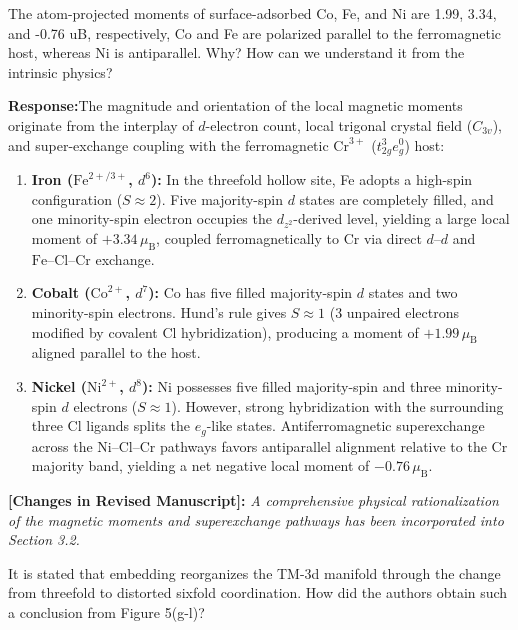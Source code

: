 \documentclass[11pt, sans, a4paper]{moderncv}
\newcommand{\response}{\vspace{0.4em}\noindent\textbf{\color{actionblue}Response:}\hspace{0.5em}}
\newcommand{\manuscriptchange}[1]{\vspace{0.3em}\noindent\textbf{\color{acsblue}[Changes in Revised Manuscript]:} \textit{#1}\vspace{0.4em}}
\begin{document}
\begin{reviewercomment}
The atom-projected moments of surface-adsorbed Co, Fe, and Ni are 1.99, 3.34, and -0.76 uB, respectively, Co and Fe are polarized parallel to the ferromagnetic host, whereas Ni is antiparallel. Why? How can we understand it from the intrinsic physics?
\end{reviewercomment}

\response The magnitude and orientation of the local magnetic moments originate from the interplay of $d$-electron count, local trigonal crystal field ($C_{3v}$), and super-exchange coupling with the ferromagnetic $\text{Cr}^{3+}$ ($t_{2g}^3 e_g^0$) host:
\begin{enumerate}[leftmargin=1.5em, itemsep=0.2em]
    \item \textbf{Iron ($\text{Fe}^{2+/3+}$, $d^6$):} In the threefold hollow site, Fe adopts a high-spin configuration ($S \approx 2$). Five majority-spin $d$ states are completely filled, and one minority-spin electron occupies the $d_{z^2}$-derived level, yielding a large local moment of $+3.34\,\mu_{\mathrm{B}}$, coupled ferromagnetically to Cr via direct $d\text{--}d$ and $\text{Fe--Cl--Cr}$ exchange.
    \item \textbf{Cobalt ($\text{Co}^{2+}$, $d^7$):} Co has five filled majority-spin $d$ states and two minority-spin electrons. Hund's rule gives $S \approx 1$ ($3$ unpaired electrons modified by covalent Cl hybridization), producing a moment of $+1.99\,\mu_{\mathrm{B}}$ aligned parallel to the host.
    \item \textbf{Nickel ($\text{Ni}^{2+}$, $d^8$):} Ni possesses five filled majority-spin and three minority-spin $d$ electrons ($S \approx 1$). However, strong hybridization with the surrounding three Cl ligands splits the $e_g$-like states. Antiferromagnetic superexchange across the $\text{Ni--Cl--Cr}$ pathways favors antiparallel alignment relative to the Cr majority band, yielding a net negative local moment of $-0.76\,\mu_{\mathrm{B}}$.
\end{enumerate}

\manuscriptchange{A comprehensive physical rationalization of the magnetic moments and superexchange pathways has been incorporated into Section 3.2.}

\begin{reviewercomment}
It is stated that embedding reorganizes the TM-3d manifold through the change from threefold to distorted sixfold coordination. How did the authors obtain such a conclusion from Figure 5(g-l)?
\end{reviewercomment}
\end{document}
